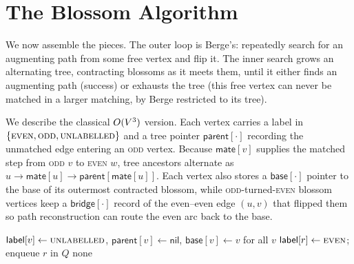 \section{The Blossom Algorithm}

We now assemble the pieces. The outer loop is Berge's: repeatedly search for an augmenting path from
some free vertex and flip it. The inner search grows an alternating tree, contracting blossoms as it
meets them, until it either finds an augmenting path (success) or exhausts the tree (this free vertex
can never be matched in a larger matching, by Berge restricted to its tree).

We describe the classical $O(V^3)$ version. Each vertex carries a label in
$\{\textsc{even},\textsc{odd},\textsc{unlabelled}\}$ and a tree pointer $\textsf{parent}[\cdot]$
recording the unmatched edge entering an \textsc{odd} vertex. Because $\textsf{mate}[v]$ supplies the
matched step from \textsc{odd} $v$ to \textsc{even} $w$, tree ancestors alternate as
$u \to \textsf{mate}[u] \to \textsf{parent}[\textsf{mate}[u]]$. Each vertex also stores a
$\textsf{base}[\cdot]$ pointer to the base of its outermost contracted blossom, while
\textsc{odd}-turned-\textsc{even} blossom vertices keep a $\textsf{bridge}[\cdot]$ record of the
even--even edge $(u,v)$ that flipped them so path reconstruction can route the even arc back to the base.

\begin{algorithm}[H]
\caption{\textsc{FindAugmentingPath}$(\Gph,M,r)$ -- alternating search with blossom contraction}
\label{ch17:alg-find}
\DontPrintSemicolon
{}
$\textsf{label}[v]\gets\textsc{unlabelled}$, $\textsf{parent}[v]\gets\textsf{nil}$, $\textsf{base}[v]\gets v$ for all $v$\;
$\textsf{label}[r]\gets\textsc{even}$; enqueue $r$ in $Q$\;
\Return \textsf{none}\;
\end{algorithm}

